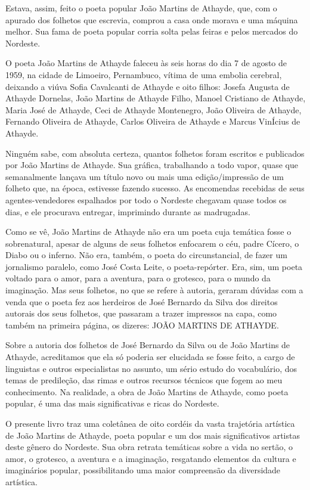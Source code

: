 \documentclass[12pt]{extarticle}
\begin{document}
Estava, assim, feito o poeta popular João Martins de Athayde, que, com
o apurado dos folhetos que escrevia, comprou a casa onde morava e uma máquina
melhor. Sua fama de poeta popular corria solta pelas feiras e pelos mercados do
Nordeste.

O poeta João Martins de Athayde faleceu às seis horas do dia 7 de agosto de
1959, na cidade de Limoeiro, Pernambuco, vítima de uma embolia cerebral,
deixando a viúva Sofia Cavalcanti de Athayde e oito filhos: Josefa Augusta de
Athayde Dornelas, João Martins de Athayde Filho, Manoel Cristiano de Athayde,
Maria José de Athayde, Ceci de Athayde Montenegro, João Oliveira de Athayde,
Fernando Oliveira de Athayde, Carlos Oliveira de Athayde e Marcus VinÍcius de
Athayde.

Ninguém sabe, com absoluta certeza, quantos folhetos foram escritos
e publicados por João Martins de Athayde. Sua gráfica, trabalhando a todo
vapor, quase que semanalmente lançava um título novo ou mais uma
edição/impressão de um folheto que, na época, estivesse fazendo sucesso.  As
encomendas recebidas de seus agentes-vendedores espalhados por todo o Nordeste
chegavam quase todos os dias, e ele procurava entregar, imprimindo durante as
madrugadas.

Como se vê, João Martins de Athayde não era um poeta cuja temática fosse
o sobrenatural, apesar de alguns de seus folhetos enfocarem o céu, padre
Cícero, o Diabo ou o inferno. Não era, também, o poeta do circunstancial, de
fazer um jornalismo paralelo, como José Costa Leite, o poeta-repórter. Era,
sim, um poeta voltado para o amor, para a aventura, para o grotesco, para
o mundo da imaginação. Mas seus folhetos, no que se refere à autoria, geraram
dúvidas com a venda que o poeta fez aos herdeiros de José Bernardo da Silva dos
direitos autorais dos seus folhetos, que passaram a trazer impressos na capa,
como também na primeira página, os dizeres: JOÃO MARTINS DE ATHAYDE.

Sobre a autoria dos folhetos de José Bernardo da Silva ou de João Martins de
Athayde, acreditamos que ela só poderia ser elucidada se fosse feito, a cargo
de linguistas e outros especialistas no assunto, um sério estudo do
vocabulário, dos temas de predileção, das rimas e outros recursos técnicos que
fogem ao meu conhecimento. Na realidade, a obra de João Martins de Athayde,
como poeta popular, é uma das mais significativas e ricas do Nordeste.

O presente livro traz uma coletânea de oito cordéis da vasta trajetória
artística de João Martins de Athayde, poeta popular e um dos mais
significativos artistas deste gênero do Nordeste. Sua obra retrata temáticas
sobre a vida no sertão, o amor, o grotesco, a aventura e a imaginação,
resgatando elementos da cultura e imaginários popular, possibilitando uma maior
compreensão da diversidade artística.
\end{document}
